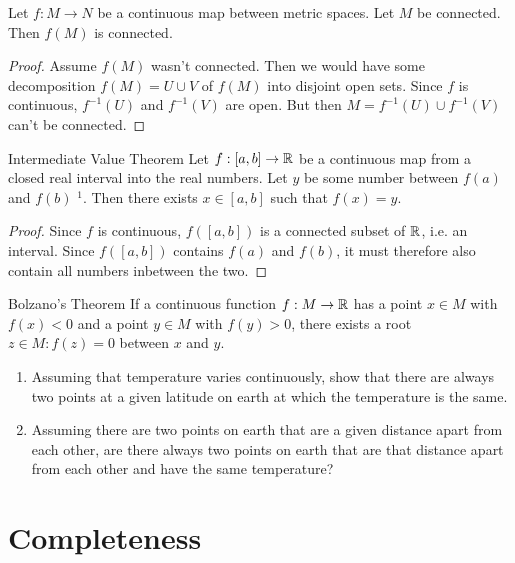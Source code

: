 \begin{theorem}
	Let $f : M \to N$ be a continuous map between metric spaces. Let $M$ be connected. Then $f(M)$ is connected.
\end{theorem}
\begin{proof}
	Assume $f(M)$ wasn't connected. Then we would have some decomposition $f(M) = U \cup V$ of $f(M)$ into disjoint open sets. Since $f$ is continuous, $f^{-1}(U)$ and $f^{-1}(V)$ are open. But then $M = f^{-1}(U) \cup f^{-1}(V)$ can't be connected.
\end{proof}
\begin{importantcorollary}{Intermediate Value Theorem}{}
	Let $f : [a,b] \to \mathbb{R}$ be a continuous map from a closed real interval into the real numbers. Let $y$ be some number between $f(a)$ and $f(b)$ $^1$.  Then there exists $x \in [a,b]$ such that $f(x) = y$.
\end{importantcorollary}
\begin{proof}
	Since $f$ is continuous, $f([a,b])$ is a connected subset of $\mathbb{R}$, i.e. an interval. Since $f([a,b])$ contains $f(a)$ and $f(b)$, it must therefore also contain all numbers inbetween the two.
\end{proof}
\begin{importantcorollary}{Bolzano's Theorem}{}
	If a continuous function $f : M \to \mathbb{R}$ has a point $x \in M$ with $f(x) < 0$ and a point $y \in M$ with $f(y) > 0$, there exists a root $z \in M : f(z) = 0$ between $x$ and $y$.
\end{importantcorollary}
\begin{exercise}
	\begin{enumerate}
		\item Assuming that temperature varies continuously, show that there are always two points at a given latitude on earth at which the temperature is the same.
		\item Assuming there are two points on earth that are a given distance apart from each other, are there always two points on earth that are that distance apart from each other and have the same temperature?
	\end{enumerate}
\end{exercise}
\section{Completeness}
